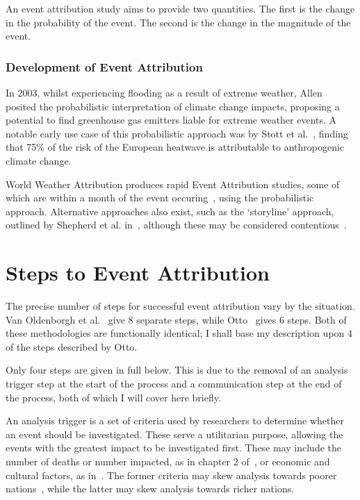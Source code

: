 \documentclass[12pt,a4paper]{report}
\begin{document}
An event attribution study aims to provide two quantities.
The first is the change in the probability of the event.
The second is the change in the magnitude of the event.

\subsubsection{Development of Event Attribution}

In 2003, whilst experiencing flooding as a result of extreme weather,
    Allen~\cite{Allen_2003} posited the probabilistic interpretation of climate change impacts,
    proposing a potential to find greenhouse gas emitters liable for extreme weather events.
A notable early use case of this probabilistic approach was by Stott et al.~\cite{Stott_2004},
    finding that 75\% of the risk of the European heatwave is attributable to anthropogenic climate change.

World Weather Attribution produces rapid Event Attribution studies,
    some of which are within a month of the event occuring~\cite{van_Oldenborgh_et_al_2018},
    using the probabilistic approach.
Alternative approaches also exist,
    such as the `storyline' approach,
    outlined by Shepherd et al. in~\cite{Shepherd_et_al_2018},
    although these may be considered contentious~\cite{García-Portela_Maraun_2023}.

\section{Steps to Event Attribution}\label{subsec:attrsteps}

The precise number of steps for successful event attribution vary by the situation.
Van Oldenborgh et al.~\cite{van_Oldenborgh_et_al_2021} give 8 separate steps,
    while Otto~\cite{Otto_2017} gives 6 steps.
Both of these methodologies are functionally identical;
    I shall base my description upon 4 of the steps described by Otto.

Only four steps are given in full below.
This is due to the removal of an analysis trigger step at the start of the process
    and a communication step at the end of the process,
    both of which I will cover here briefly.

An analysis trigger is a set of criteria used by researchers to determine whether an event should be investigated.
These serve a utilitarian purpose,
    allowing the events with the greatest impact to be investigated first.
These may include the number of deaths or number impacted,
    as in chapter 2 of~\cite{van_Oldenborgh_et_al_2021},
    or economic and cultural factors, as in~\cite{Tett_Soon}.
The former criteria may skew analysis towards poorer nations~\cite{Kahn_2005},
    while the latter may skew analysis towards richer nations.
\end{document}
